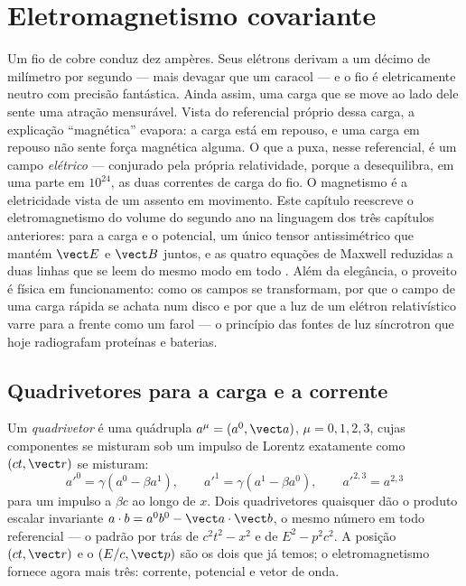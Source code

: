 \chapter{Eletromagnetismo covariante}\label{ch:b3:covariant-electromagnetism}

Um fio de cobre conduz dez ampères. Seus elétrons derivam a um décimo
de milímetro por segundo --- mais devagar que um caracol --- e o fio é
eletricamente neutro com precisão fantástica. Ainda assim, uma carga
que se move ao lado dele sente uma atração mensurável. Vista do
referencial próprio dessa carga, a explicação ``magnética'' evapora: a
carga está em repouso, e uma carga em repouso não sente força magnética
alguma. O que a puxa, nesse referencial, é um campo \emph{elétrico} ---
conjurado pela própria relatividade, porque a  desequilibra, em uma parte em
$10^{24}$, as duas correntes de carga do fio. O magnetismo é a
eletricidade vista de um assento em movimento. Este capítulo reescreve
o eletromagnetismo do volume do segundo ano na linguagem dos três
capítulos anteriores:  para a carga e o potencial, um
único tensor antissimétrico que mantém $\vect E$ e $\vect B$ juntos, e
as quatro equações de Maxwell reduzidas a duas linhas que se leem do
mesmo modo em todo . Além da elegância, o proveito
é física em funcionamento: como os campos se transformam, por que o
campo de uma carga rápida se achata num disco e por que a luz de um
elétron relativístico varre para a frente como um farol --- o princípio
das fontes de luz síncrotron que hoje radiografam proteínas e baterias.

\section{Quadrivetores para a carga e a corrente}

\begin{definition}[Quadrivetores]\label{def:b3:covariant-electromagnetism:fourvector}
Um \emph{quadrivetor} é uma quádrupla $a^\mu = (a^0, \vect a)$, $\mu =
0, 1, 2, 3$, cujas componentes se misturam sob um impulso de Lorentz
exatamente como $(ct,
\vect r)$ se misturam:
\[
a'^0 = \gamma(a^0 - \beta a^1) , \qquad
a'^1 = \gamma(a^1 - \beta a^0) , \qquad
a'^{2,3} = a^{2,3}
\]
para um impulso a $\beta c$ ao longo de $x$. Dois quadrivetores
quaisquer dão o produto escalar invariante
$a\cdot b = a^0b^0 - \vect a\cdot\vect b$, o mesmo número em todo
referencial --- o padrão por trás de $c^2t^2 - x^2$ e de
$E^2 - p^2c^2$. A posição $(ct, \vect r)$ e o 
$(E/c, \vect p)$ são os dois que já temos; o eletromagnetismo fornece
agora mais três: corrente, potencial e vetor de onda.
\end{definition}

